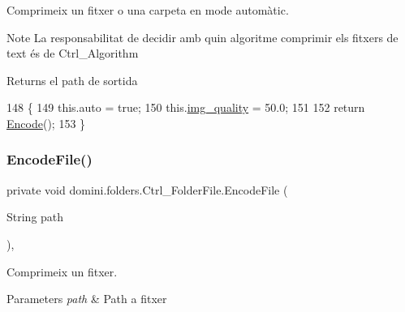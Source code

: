 Comprimeix un fitxer o una carpeta en mode automàtic. 

\begin{DoxyNote}{Note}
La responsabilitat de decidir amb quin algoritme comprimir els fitxers de text és de Ctrl\+\_\+\+Algorithm 
\end{DoxyNote}
\begin{DoxyReturn}{Returns}
el path de sortida 
\end{DoxyReturn}

\begin{DoxyCode}
148                                \{
149         this.\textcolor{keyword}{auto} = \textcolor{keyword}{true};
150         this.\hyperlink{classdomini_1_1folders_1_1Ctrl__FolderFile_a7990a74c394d53a58ebbf4a7872c700d}{img\_quality} = 50.0;
151 
152         \textcolor{keywordflow}{return} \hyperlink{classdomini_1_1folders_1_1Ctrl__FolderFile_a7c47fd5127ae6f713a4fa7f75002a6f6}{Encode}();
153     \}
\end{DoxyCode}
\mbox{\label{classdomini_1_1folders_1_1Ctrl__FolderFile_a0b2b642b6c23124539d0306955be7f0c}} 
\subsubsection{\texorpdfstring{Encode\+File()}{EncodeFile()}}
{\footnotesize\ttfamily private void domini.\+folders.\+Ctrl\+\_\+\+Folder\+File.\+Encode\+File (\begin{DoxyParamCaption}\item[{String}]{path }\end{DoxyParamCaption})\hspace{0.3cm}{\ttfamily [inline]}, {\ttfamily [private]}}



Comprimeix un fitxer. 


\begin{DoxyParams}{Parameters}
{\em path} & Path a fitxer \\
\hline
\end{DoxyParams}

